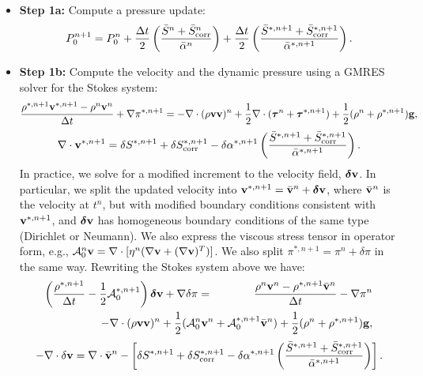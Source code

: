 \documentclass[final]{siamltex}
\def\gb {{\bf g}}
\def\vb {{\bf v}}
\def\deltab {\boldsymbol{\delta}}
\def\taub   {\boldsymbol{\tau}}
\def\half   {\frac{1}{2}}
\begin{document}
\begin{itemize}
\item {\bf Step 1a:} Compute a pressure update:
\begin{equation}
P_0^{n+1} = P_0^n + \frac{\Delta t}{2}\left(\frac{\bar{S}^n + \bar{S}_{\rm corr}^n}{\bar{\alpha}^n}\right) + \frac{\Delta t}{2}\left(\frac{\bar{S}^{*,n+1} + \bar{S}_{\rm corr}^{*,n+1}}{\bar{\alpha}^{*,n+1}}\right).
\end{equation}
\item {\bf Step 1b:} Compute the velocity and the dynamic pressure using a GMRES solver for the Stokes system:
\begin{equation}
\frac{\rho^{*,n+1}\vb^{*,n+1} - \rho^n\vb^n}{\Delta t} + \nabla\pi^{*,n+1} = -\nabla\cdot(\rho\vb\vb)^n + \frac{1}{2}\nabla\cdot(\taub^n + \taub^{*,n+1}) + \frac{1}{2}(\rho^n + \rho^{*,n+1})\gb,
\end{equation}
\begin{equation}
\nabla\cdot\vb^{*,n+1} = \delta S^{*,n+1} + \delta S_{\rm corr}^{*,n+1} - \delta\alpha^{*,n+1}\left(\frac{\bar{S}^{*,n+1} + \bar{S}_{\rm corr}^{*,n+1}}{\bar{\alpha}^{*,n+1}}\right).
\end{equation}
In practice, we solve for a modified increment to the velocity field, $\deltab\vb$.  In particular,
we split the updated velocity into
$\vb^{*,n+1} = \bar{\vb}^n + \deltab\vb$, where $\bar{\vb}^n$ is the velocity at $t^n$, but with modified boundary
conditions consistent with $\vb^{*,n+1}$, and $\deltab\vb$ has homogeneous boundary conditions of the same type (Dirichlet or Neumann).
We also express the viscous stress tensor in operator form, e.g., 
$\mathcal{A}_0^n\vb = \nabla\cdot[\eta^n(\nabla\vb + (\nabla\vb)^T)]$.  
We also split $\pi^{*,n+1} = \pi^n + \delta\pi$ in the same way.  Rewriting the Stokes system above we have:
\begin{eqnarray}
\left(\frac{\rho^{*,n+1}}{\Delta t} - \half\mathcal{A}_0^{*,n+1}\right)\deltab\vb + \nabla\delta\pi &=& \frac{\rho^n\vb^n - \rho^{*,n+1}\bar{\vb}^n}{\Delta t} - \nabla\pi^n\nonumber\\
&&\hspace{-1.5in} - \nabla\cdot(\rho\vb\vb)^n + \half(\mathcal{A}_0^n\vb^n+\mathcal{A}_0^{*,n+1}\bar{\vb}^n) + \half(\rho^n + \rho^{*,n+1})\gb,
\end{eqnarray}
\begin{equation}
-\nabla\cdot\delta\vb = \nabla\cdot\bar{\vb}^n - \left[\delta S^{*,n+1} + \delta S_{\rm corr}^{*,n+1} - \delta\alpha^{*,n+1}\left(\frac{\bar{S}^{*,n+1} + \bar{S}_{\rm corr}^{*,n+1}}{\bar{\alpha}^{*,n+1}}\right)\right].

\end{equation}
\end{itemize}
\end{document}
